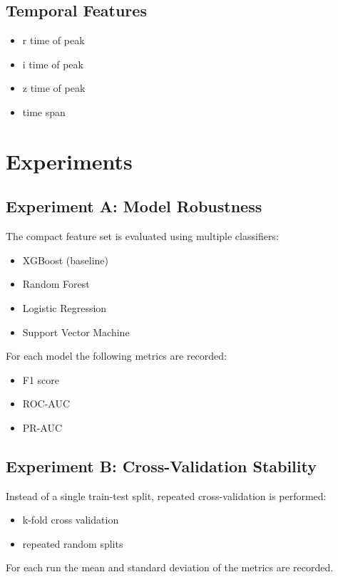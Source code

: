\subsection{Temporal Features}
\begin{itemize}
\item r time of peak
\item i time of peak
\item z time of peak
\item time span
\end{itemize}

\section{Experiments}

\subsection{Experiment A: Model Robustness}

The compact feature set is evaluated using multiple classifiers:
\begin{itemize}
\item XGBoost (baseline)
\item Random Forest
\item Logistic Regression
\item Support Vector Machine
\end{itemize}

For each model the following metrics are recorded:
\begin{itemize}
\item F1 score
\item ROC-AUC
\item PR-AUC
\end{itemize}

\subsection{Experiment B: Cross-Validation Stability}

Instead of a single train-test split, repeated cross-validation is performed:
\begin{itemize}
\item k-fold cross validation
\item repeated random splits
\end{itemize}

For each run the mean and standard deviation of the metrics are recorded.

